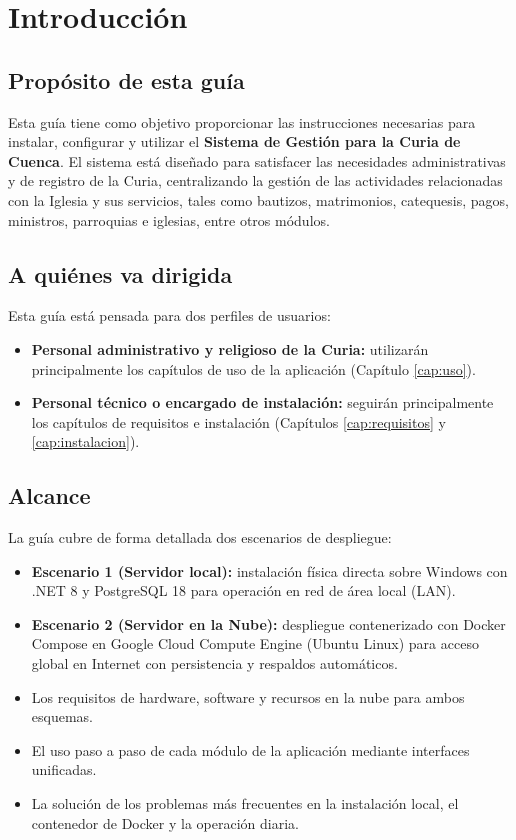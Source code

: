 \chapter{Introducción}

\section{Propósito de esta guía}
Esta guía tiene como objetivo proporcionar las instrucciones necesarias para instalar, configurar y utilizar el \textbf{Sistema de Gestión para la Curia de Cuenca}. El sistema está diseñado para satisfacer las necesidades administrativas y de registro de la Curia, centralizando la gestión de las actividades relacionadas con la Iglesia y sus servicios, tales como bautizos, matrimonios, catequesis, pagos, ministros, parroquias e iglesias, entre otros módulos.

\section{A quiénes va dirigida}
Esta guía está pensada para dos perfiles de usuarios:
\begin{itemize}
    \item \textbf{Personal administrativo y religioso de la Curia:} utilizarán principalmente los capítulos de uso de la aplicación (Capítulo \ref{cap:uso}).
    \item \textbf{Personal técnico o encargado de instalación:} seguirán principalmente los capítulos de requisitos e instalación (Capítulos \ref{cap:requisitos} y \ref{cap:instalacion}).
\end{itemize}

\section{Alcance}
La guía cubre de forma detallada dos escenarios de despliegue:
\begin{itemize}
    \item \textbf{Escenario 1 (Servidor local):} instalación física directa sobre Windows con .NET 8 y PostgreSQL 18 para operación en red de área local (LAN).
    \item \textbf{Escenario 2 (Servidor en la Nube):} despliegue contenerizado con Docker Compose en Google Cloud Compute Engine (Ubuntu Linux) para acceso global en Internet con persistencia y respaldos automáticos.
    \item Los requisitos de hardware, software y recursos en la nube para ambos esquemas.
    \item El uso paso a paso de cada módulo de la aplicación mediante interfaces unificadas.
    \item La solución de los problemas más frecuentes en la instalación local, el contenedor de Docker y la operación diaria.
\end{itemize}

